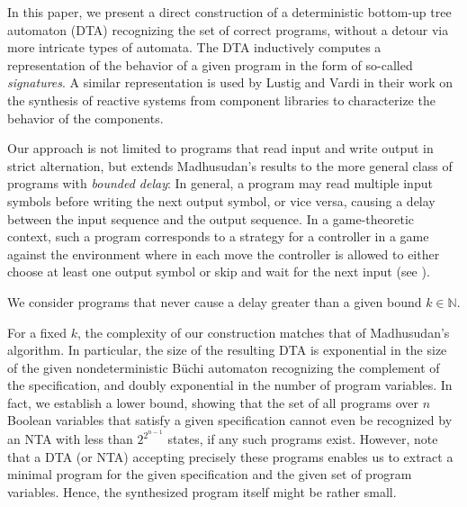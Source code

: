 \documentclass[submission,copyright,creativecommons]{eptcs}
\newcommand{\ignore}[1]{}
\begin{document}
In this paper, we present a direct construction of a deterministic bottom-up
tree automaton (DTA) recognizing the set of correct programs, without a detour
via more intricate types of automata.
The DTA inductively computes a representation of the behavior of a given
program in the form of so-called \emph{signatures}.
A similar representation is used by Lustig and Vardi in their work on the
synthesis of reactive systems from component libraries
\cite{Lustig09} to characterize the behavior of\ignore{TODO: Adjective here?}
the components.

Our approach is not limited to programs that read input and write output in
strict alternation, but extends Madhusudan's results to the more general class
of programs with \emph{bounded delay}:
In general, a program may read multiple input symbols before writing the next
output symbol, or vice versa, causing a delay between the input sequence and
the output sequence.
In a game-theoretic context, such a program corresponds to a strategy for a
controller in a game against the environment where in each move
the controller is allowed to either choose at least one output symbol or
skip and wait for the next input (see \cite{Holtmann10}).
\ignore{Reading multiple input symbols in a row is necessary to satisfy specifications
that require a certain amount of lookahead on the input sequence.
On the other hand, writing multiple output symbols in a row may
reduce\ignore{TODO! Other word?} the required number of program variables,
because once an output symbol has been written, no information about that
symbol has to be stored anymore.}
We consider programs that never cause a delay greater than a given bound
$k \in \mathbb{N}$.

\ignore{
Note that reading multiple input symbols in a row can be necessary if the
specification requires a certain amount of lookahead on the input sequence.
On the other hand, writing multiple output symbols before reading the next
input symbol may reduce the required number of program variables.
For example, consider the specification that requires for some fixed
$m \in \mathbb{N}$ that the $(i+m)$th output symbol agrees with the $i$th
input symbol, for all $i \in \mathbb{N}$.
Any program that reads input and writes output in strict alternation needs at
least $m+1$ Boolean variables to satisfy the specification.
However, if the first $m$ output symbols are written
before reading the first input symbol, a single variable suffices.
}

For a fixed $k$, the complexity of our construction matches that of
Madhusudan's algorithm.
In particular, the size of the resulting DTA is exponential in the size of the
given nondeterministic Büchi automaton recognizing the complement of the
specification, and doubly exponential in the number of program variables.
In fact, we establish a lower bound, showing that the set of all programs
over $n$ Boolean variables that satisfy a given specification cannot even be
recognized by an NTA with less than $2^{2^{n-1}}$ states,
if any such programs exist.
However, note that a DTA (or NTA) accepting precisely these programs enables
us to extract a minimal program for the given specification and the given set
of program variables.
Hence, the synthesized program itself might be rather small.
\end{document}
